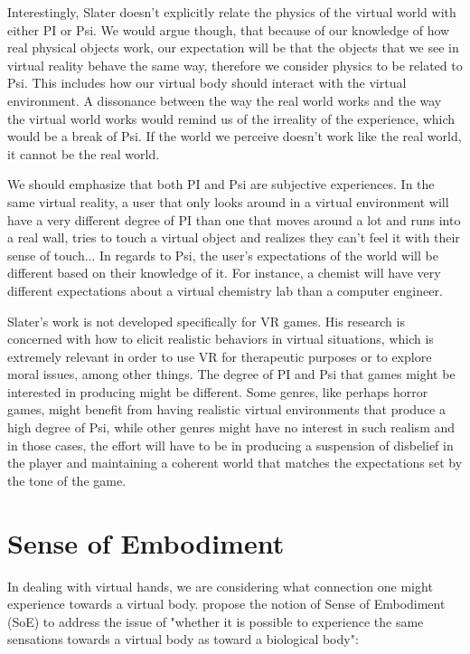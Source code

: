 Interestingly, Slater doesn't explicitly relate the physics of the virtual world with either PI or Psi. We would argue though, that because of our knowledge of how real physical objects work, our expectation will be that the objects that we see in virtual reality behave the same way, therefore we consider physics to be related to Psi. This includes how our virtual body should interact with the virtual environment. A dissonance between the way the real world works and the way the virtual world works would remind us of the irreality of the experience, which would be a break of Psi. If the world we perceive doesn't work like the real world, it cannot be the real world. 

We should emphasize that both PI and Psi are subjective experiences. In the same virtual reality, a user that only looks around in a virtual environment will have a very different degree of PI than one that moves around a lot and runs into a real wall, tries to touch a virtual object and realizes they can't feel it with their sense of touch... In regards to Psi, the user's expectations of the world will be different based on their knowledge of it. For instance, a chemist will have very different expectations about a virtual chemistry lab than a computer engineer.

Slater's work is not developed specifically for VR games. His research is concerned with how to elicit realistic behaviors in virtual situations, which is extremely relevant in order to use VR for therapeutic purposes or to explore moral issues, among other things. The degree of PI and Psi that games might be interested in producing might be different. Some genres, like perhaps horror games, might benefit from having realistic virtual environments that produce a high degree of Psi, while other genres might have no interest in such realism and in those cases, the effort will have to be in producing a suspension of disbelief in the player and maintaining a coherent world that matches the expectations set by the tone of the game.

\section{Sense of Embodiment}
\label{sec:embodiment}

In dealing with virtual hands, we are considering what connection one might experience towards a virtual body. \parencite{Kilteni2012} propose the notion of Sense of Embodiment (SoE) to address the issue of "whether it is possible to experience the same sensations towards a virtual body as toward a biological body":

